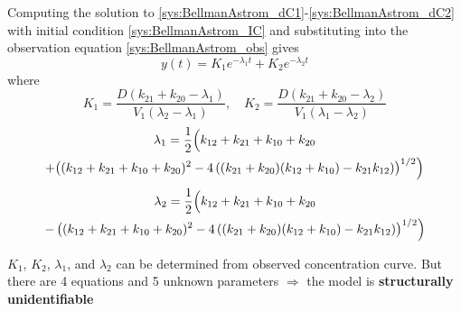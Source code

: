 \documentclass[aspectratio=43]{beamer}
\begin{document}
\begin{frame}
	Computing the solution to \eqref{sys:BellmanAstrom_dC1}-\eqref{sys:BellmanAstrom_dC2} with initial condition \eqref{sys:BellmanAstrom_IC} and substituting into the observation equation \eqref{sys:BellmanAstrom_obs} gives
	\[
        y(t)=K_1e^{-\lambda_1 t}+K_2e^{-\lambda_2 t}
    \]
	where
    \[
        K_1=\frac{D(k_{21}+k_{20}-\lambda_1)}{V_1(\lambda_2-\lambda_1)},
        \quad
        K_2=\frac{D(k_{21}+k_{20}-\lambda_2)}{V_1(\lambda_1-\lambda_2)}
    \]
    \begin{multline*}
        \lambda_1=\frac 12 \Bigl( k_{12}+k_{21}+k_{10}+k_{20} \\
        + \bigl( (k_{12}+k_{21}+k_{10}+k_{20})^2 - 4\left((k_{21}+k_{20})(k_{12}+k_{10} \right)-k_{21}k_{12})\bigr)^{1/2} \Bigr)
    \end{multline*}
	\begin{multline*}
        \lambda_2=\frac 12\Bigl( k_{12}+k_{21}+k_{10}+k_{20} \\
        -\left( (k_{12}+k_{21}+k_{10}+k_{20})^2 - 4\left((k_{21}+k_{20})(k_{12}+k_{10}\right )-k_{21}k_{12})\right)^{1/2} \Bigr)
    \end{multline*}
	
	
	$K_1$, $K_2$, $\lambda_1$, and $\lambda_2$ can be determined from observed concentration curve.
	But there are 4 equations and 5 unknown parameters  $\Rightarrow$ the model is \textbf{structurally unidentifiable}
\end{frame}
\end{document}
